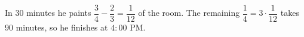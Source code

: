 In $30$ minutes he paints $\dfrac{3}{4}-\dfrac{2}{3}=\dfrac{1}{12}$ of the room. The remaining $\dfrac{1}{4}=3\cdot\dfrac{1}{12}$ takes $90$ minutes, so he finishes at $\boxed{4{:}00\text{ PM}}$.
